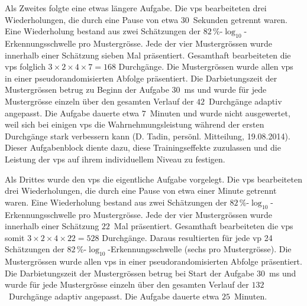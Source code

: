 \documentclass[11pt, twoside, a4paper]{book}		%
\begin{document}
Als Zweites folgte eine etwas längere Aufgabe. Die \glspl{vp} bearbeiteten drei Wiederholungen, die durch eine Pause von etwa $30$~Sekunden getrennt waren. Eine Wiederholung bestand aus zwei Schätzungen der $82\,\%$-$\log_{10}$-Er\-ken\-nungs\-schwel\-le pro Mustergrösse. Jede der vier Mustergrössen wurde innerhalb einer Schätzung sieben Mal präsentiert. Gesamthaft bearbeiteten die \glspl{vp} folglich $3 \times 2 \times 4 \times 7 = 168$ Durchgänge. Die Mustergrössen wurde allen \glspl{vp} in einer pseudorandomisierten Abfolge präsentiert. Die Darbietungszeit der Mustergrössen betrug zu Beginn der Aufgabe $30$~ms und wurde für jede Mustergrösse einzeln über den gesamten Verlauf der $42$~Durchgänge adaptiv angepasst. Die Aufgabe dauerte etwa $7$~Minuten und wurde nicht ausgewertet, weil sich bei einigen \glspl{vp} die Wahrnehmungsleistung während der ersten Durchgänge stark verbessern kann (D. Tadin, persönl. Mitteilung, 19.08.2014). Dieser Aufgabenblock diente dazu, diese Trainingseffekte zuzulassen und die Leistung der \glspl{vp} auf ihrem individuellem Niveau zu festigen. 

Als Drittes wurde den \glspl{vp} die eigentliche Aufgabe vorgelegt. Die \glspl{vp} bearbeiteten drei Wiederholungen, die durch eine Pause von etwa einer Minute getrennt waren. Eine Wiederholung bestand aus zwei Schätzungen der $82\,\%$-$\log_{10}$-Er\-ken\-nungs\-schwel\-le pro Mustergrösse. Jede der vier Mustergrössen wurde innerhalb einer Schätzung $22$~Mal präsentiert. Gesamthaft bearbeiteten die \glspl{vp} somit $3 \times 2 \times 4 \times 22 = 528$ Durchgänge. 
Daraus resultierten für jede \gls{vp} 24 Schätzungen der $82\,\%$-$\log_{10}$-Er\-ken\-nungs\-schwel\-le (sechs pro Mustergrösse).
Die Mustergrössen wurde allen \glspl{vp} in einer pseudorandomisierten Abfolge präsentiert. Die Darbietungszeit der Mustergrössen betrug bei Start der Aufgabe $30$~ms und wurde für jede Mustergrösse einzeln über den gesamten Verlauf der $132$~Durchgänge adaptiv angepasst. 
Die Aufgabe dauerte etwa $25$~Minuten. 
\end{document}
